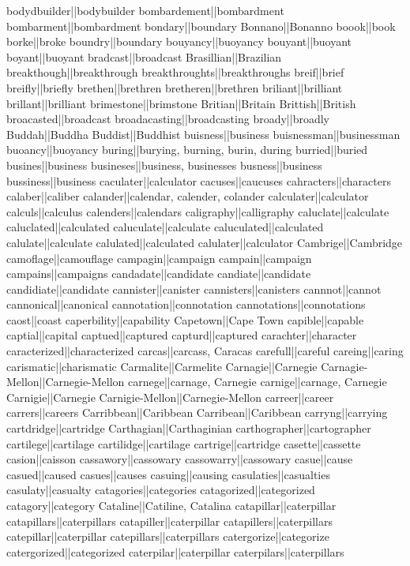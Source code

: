 bodydbuilder||bodybuilder
bombardement||bombardment
bombarment||bombardment
bondary||boundary
Bonnano||Bonanno
boook||book
borke||broke
boundry||boundary
bouyancy||buoyancy
bouyant||buoyant
boyant||buoyant
bradcast||broadcast
Brasillian||Brazilian
breakthough||breakthrough
breakthroughts||breakthroughs
breif||brief
breifly||briefly
brethen||brethren
bretheren||brethren
briliant||brilliant
brillant||brilliant
brimestone||brimstone
Britian||Britain
Brittish||British
broacasted||broadcast
broadacasting||broadcasting
broady||broadly
Buddah||Buddha
Buddist||Buddhist
buisness||business
buisnessman||businessman
buoancy||buoyancy
buring||burying, burning, burin, during
burried||buried
busines||business
busineses||business, businesses
busness||business
bussiness||business
caculater||calculator
cacuses||caucuses
cahracters||characters
calaber||caliber
calander||calendar, calender, colander
calculater||calculator
calculs||calculus
calenders||calendars
caligraphy||calligraphy
caluclate||calculate
caluclated||calculated
caluculate||calculate
caluculated||calculated
calulate||calculate
calulated||calculated
calulater||calculator
Cambrige||Cambridge
camoflage||camouflage
campagin||campaign
campain||campaign
campains||campaigns
candadate||candidate
candiate||candidate
candidiate||candidate
cannister||canister
cannisters||canisters
cannnot||cannot
cannonical||canonical
cannotation||connotation
cannotations||connotations
caost||coast
caperbility||capability
Capetown||Cape Town
capible||capable
captial||capital
captued||captured
capturd||captured
carachter||character
caracterized||characterized
carcas||carcass, Caracas
carefull||careful
careing||caring
carismatic||charismatic
Carmalite||Carmelite
Carnagie||Carnegie
Carnagie-Mellon||Carnegie-Mellon
carnege||carnage, Carnegie
carnige||carnage, Carnegie
Carnigie||Carnegie
Carnigie-Mellon||Carnegie-Mellon
carreer||career
carrers||careers
Carribbean||Caribbean
Carribean||Caribbean
carryng||carrying
cartdridge||cartridge
Carthagian||Carthaginian
carthographer||cartographer
cartilege||cartilage
cartilidge||cartilage
cartrige||cartridge
casette||cassette
casion||caisson
cassawory||cassowary
cassowarry||cassowary
casue||cause
casued||caused
casues||causes
casuing||causing
casulaties||casualties
casulaty||casualty
catagories||categories
catagorized||categorized
catagory||category
Cataline||Catiline, Catalina
catapillar||caterpillar
catapillars||caterpillars
catapiller||caterpillar
catapillers||caterpillars
catepillar||caterpillar
catepillars||caterpillars
catergorize||categorize
catergorized||categorized
caterpilar||caterpillar
caterpilars||caterpillars

